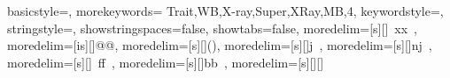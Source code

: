\usepackage{listings}
\usepackage{subfiles}
\usepackage{textcomp}
\usepackage{xcolor}
\usepackage[ampersand]{easylist}

{
  basicstyle=\ttfamily,
  morekeywords={
  Trait,WB,X-ray,Super,XRay,MB,4},
  keywordstyle=\color{red},
  stringstyle=\color{red},
  showstringspaces=false,
  showtabs=false,
  moredelim=[s][\color{blue}]{\ x}{x\ },
  moredelim=[is][\color{violet}]{@}{@},
  moredelim=[s][\color{teal}]{(}{)},
  moredelim=[s][\color{gray}]{j}{\ },
  moredelim=[s][\color{gray}]{nj}{\ },
  moredelim=[s][\color{green}]{\ ff}{\ },
moredelim=[s][\color{green}]{bb}{\ },
moredelim=[s][\color{teal}]{[}{]}
}